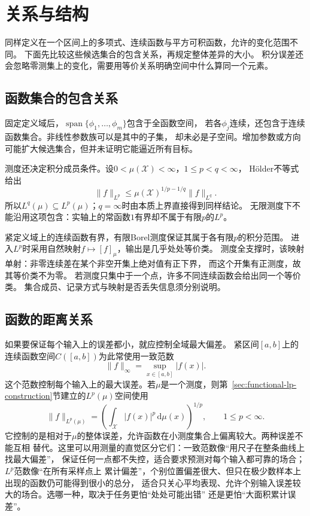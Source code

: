 \section{关系与结构}
\label{sec:functional-relations}

同样定义在一个区间上的多项式、连续函数与平方可积函数，允许的变化范围不同。
下面先比较这些候选集合的包含关系，再规定整体差异的大小。
积分误差还会忽略零测集上的变化，需要用等价关系明确空间中什么算同一个元素。

\subsection{函数集合的包含关系}
\label{sec:functional-inclusion-relations}

固定定义域后，$\operatorname{span}\{\phi_1,\ldots,\phi_m\}$包含于全函数空间，
若各$\phi_j$连续，还包含于连续函数集合。非线性参数族可以是其中的子集，
却未必是子空间。增加参数或方向可能扩大候选集合，但并未证明它能逼近所有目标。

测度还决定积分成员条件。设$0<\mu(\mathcal X)<\infty$，$1\leq p<q<\infty$，
Hölder不等式给出
\[
 \lVert f\rVert_{L^p}\leq
 \mu(\mathcal X)^{1/p-1/q}\lVert f\rVert_{L^q}.
\]
所以$L^q(\mu)\subseteq L^p(\mu)$；$q=\infty$时由本质上界直接得到同样结论。
无限测度下不能沿用这项包含：实轴上的常函数$1$有界却不属于有限$p$的$L^p$。

紧定义域上的连续函数有界，有限Borel测度保证其属于各有限$p$的积分范围。
进入$L^p$时采用自然映射$f\mapsto[f]_\mu$，输出是几乎处处等价类。
测度全支撑时，该映射单射：非零连续差在某个非空开集上绝对值有正下界，
而这个开集有正测度，故其等价类不为零。
若测度只集中于一个点，许多不同连续函数会给出同一个等价类。
集合成员、记录方式与映射是否丢失信息须分别说明。

\subsection{函数的距离关系}
\label{sec:functional-distance-relations}

如果要保证每个输入上的误差都小，就应控制全域最大偏差。
紧区间$[a,b]$上的连续函数空间$C([a,b])$为此常使用一致范数
\[
  \lVert f\rVert_{\infty}
  =\sup_{x\in[a,b]}|f(x)|.
\]
这个范数控制每个输入上的最大误差。若$\mu$是一个测度，则第~\ref{sec:functional-lp-construction}节建立的$L^p(\mu)$空间使用
\[
  \lVert f\rVert_{L^p(\mu)}
  =
  \left(\int_{\mathcal{X}}|f(x)|^p\,\mathrm{d}\mu(x)\right)^{1/p},
  \qquad 1\leq p<\infty.
\]
它控制的是相对于$\mu$的整体误差，允许函数在小测度集合上偏离较大。两种误差不能互相
替代。这里可以用测量的直觉区分它们：一致范数像“用尺子在整条曲线上找最大偏差”，
保证任何一点都不失控，适合要求预测对每个输入都可靠的场合；$L^p$范数像“在所有采样点上
累计偏差”，个别位置偏差很大、但只在极少数样本上出现的函数仍可能得到很小的总分，
适合只关心平均表现、允许个别输入误差较大的场合。选哪一种，取决于任务更怕“处处可能出错”
还是更怕“大面积累计误差”。



